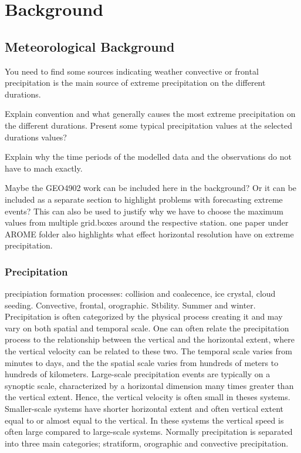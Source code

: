 \section{Background}
\label{sec:background}

\subsection{Meteorological Background}

You need to find some sources indicating weather convective or frontal precipitation is the main source of extreme precipitation on the different durations. 

Explain convention and what generally causes the most extreme precipitation on the different durations. Present some typical precipitation values at the selected durations values?

Explain why the time periods of the modelled data and the observations do not have to mach exactly. 

Maybe the GEO4902 work can be included here in the background? Or it can be included as a separate section to highlight problems with forecasting extreme events? This can also be used to justify why we have to choose the maximum values from multiple grid.boxes around the respective station.   
one paper under AROME folder also highlights what effect horizontal resolution have on extreme precipitation. 

\subsubsection{Precipitation}
precipiation formation processes: collision and coalecence, ice crystal, cloud seeding. Convective, frontal, orographic. Stbility. Summer and winter. 
Precipitation is often categorized by the physical process creating it and may vary on both spatial and temporal scale. One can often relate the precipitation process to the relationship between the vertical and the horizontal extent, where the vertical velocity can be related to these two. The temporal scale varies from minutes to days, and the the spatial scale varies from hundreds of meters to hundreds of kilometers. Large-scale precipitation events are typically on a synoptic scale, characterized by a horizontal dimension many times greater than the vertical extent. Hence, the vertical velocity is often small in theses systems. Smaller-scale systems have shorter horizontal extent and often vertical extent equal to or almost equal to the vertical. In these systems the vertical speed is often large compared to large-scale systems. Normally precipitation is separated into three main categories; stratiform, orographic and convective precipitation.

